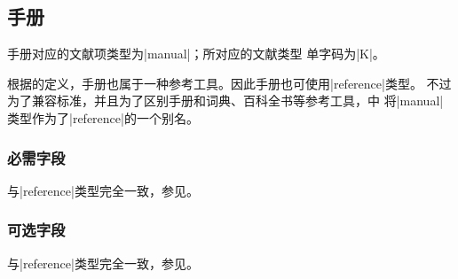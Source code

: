 
\subsection{手册}\label{subsec:bibtype-manual}

手册对应的{\BibTeX}文献项类型为|manual|；所对应的文献类型
单字码为|K|\cite{gbt3469-1983}。

\begin{note}
根据\cite{gbt3469-1983}的定义，手册也属于一种参考工具。因此手册也可使用|reference|类型。
不过为了兼容标准{\BibTeX}，并且为了区别手册和词典、百科全书等参考工具，{\njuthesis}中
将|manual|类型作为了|reference|的一个别名。
\end{note}


\subsubsection{必需字段}

与|reference|类型完全一致，参见\cite{subsec:bibtype-reference}。

\subsubsection{可选字段}

与|reference|类型完全一致，参见\cite{subsec:bibtype-reference}。
